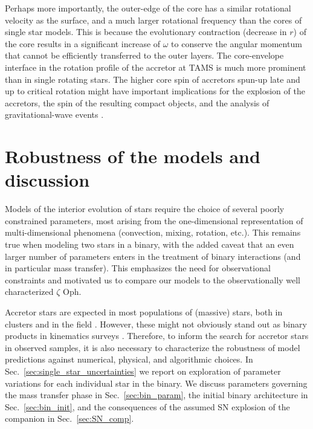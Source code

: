 \documentclass[twocolumn,twocolappendix,trackchanges]{aastex63}
\DeclareRobustCommand{\Secref}[1]{Sec.~\ref{#1}}
\newcommand{\zoph}{$\zeta$ Oph}
\begin{document}
Perhaps more importantly, the outer-edge of the core has a similar
rotational velocity as the surface, and a much larger rotational
frequency than the cores of single star models. This is because the
evolutionary contraction (decrease in $r$) of the core results in a
significant increase of $\omega$ to conserve the angular momentum that
cannot be efficiently transferred to the outer layers. The
core-envelope interface in the rotation profile of the accretor at
TAMS is much more prominent than in single rotating stars. The higher
core spin of accretors spun-up late and up to critical
rotation might have important implications for the explosion of the
accretors, the spin of the resulting
compact objects, and the analysis of gravitational-wave events
\citep[e.g.,][]{zaldarriaga:18, qin:18, callister:21}.

\section{Robustness of the models and discussion}
\label{sec:discussion}

Models of the interior evolution of stars require the choice of
several poorly constrained parameters, most arising from the
one-dimensional representation of multi-dimensional phenomena
(convection, mixing, rotation, etc.). This remains true when modeling
two stars in a binary, with the added caveat that an even larger
number of parameters enters in the treatment of binary interactions (and in
particular mass transfer). This emphasizes the need for
observational constraints and motivated us to compare our models to
the observationally well characterized \zoph.

Accretor stars are expected in most populations of (massive)
stars, both in clusters \citep[e.g.,][]{chen:09, wang:20} and in the field
\citep[e.g.,][]{demink:11, demink:13}. However, these might not obviously stand
out as binary products in kinematics surveys \citep[e.g.,][]{renzo:19walk}. Therefore, to
inform the search for accretor stars in observed samples, it is
also necessary to characterize the robustness of model predictions
against numerical, physical, and algorithmic choices.
In \Secref{sec:single_star_uncertainties}
we report on exploration of parameter variations for each individual
star in the binary. We discuss parameters governing the mass transfer phase in
\Secref{sec:bin_param}, the initial binary architecture in
\Secref{sec:bin_init}, and the consequences of the assumed SN
explosion of the companion in \Secref{sec:SN_comp}.
\end{document}

